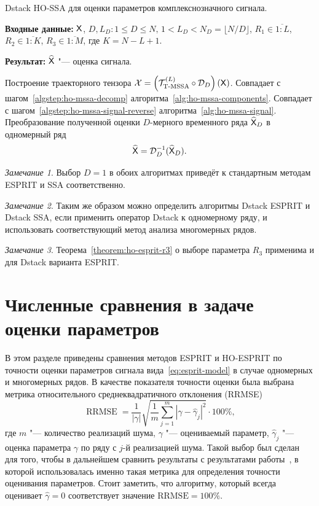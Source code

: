 \documentclass[specialist,
  substylefile=spbu_report.rtx,
subf,href,colorlinks=true, 12pt]{disser}
\theoremstyle{plain}
\theoremstyle{definition}
\theoremstyle{remark}
\newtheorem{remark}{Замечание}[section]
\newcommand{\Input}{\textbf{Входные данные: }}
\newcommand{\Output}{\textbf{Результат: }}
\begin{document}
\begin{algorithm}[!ht]
  \caption{Dstack HO-SSA для оценки параметров комплекснозначного сигнала.}
  \label{alg:dstack-ho-ssa}
  \Input $\mathsf{X}$, $D, L_D: 1 \leqslant D \leqslant N,\, 1 < L_D < N_D =
  \lfloor N /
  D \rfloor$,
  $R_1 \in \overline{1:L}$, $R_2 \in \overline{1:K}$, $R_3 \in
  \overline{1:M}$, где $K = N-L+1$.

  \Output $\widehat{\mathsf{X}}$ "--- оценка сигнала.
  \begin{algorithmic}[1]
    \State Построение траекторного тензора $\mathcal{X} =
    \left(\mathcal{T}_{\textrm{T-MSSA}}^{(L)} \circ \mathcal{D}_D\right) (\mathsf{X})$.
    \State Совпадает с шагом~\ref{algstep:ho-mssa-decomp}
    алгоритма~\ref{alg:ho-mssa-components}.
    \State Совпадает с шагом~\ref{algstep:ho-mssa-signal-reverse}
    алгоритма~\ref{alg:ho-mssa-signal}.
    \State Преобразование полученной оценки $D$-мерного временного ряда
    $\widehat{\mathsf{X}}_D$ в одномерный ряд
    \[
      \widehat{\mathsf{X}} = \mathcal{D}_D^{-1}(\widehat{\mathsf{X}}_D).
    \]
  \end{algorithmic}
\end{algorithm}
\begin{remark}
  Выбор $D=1$ в обоих алгоритмах приведёт к стандартным методам
  ESPRIT и SSA соответственно.
\end{remark}
\begin{remark}
  Таким же образом можно определить алгоритмы Dstack ESPRIT и Dstack SSA, если
  применить оператор Dstack к одномерному ряду, и использовать
  соответствующий метод
  анализа многомерных рядов.
\end{remark}
\begin{remark}
  Теорема~\ref{theorem:ho-esprit-r3} о выборе параметра $R_3$
  применима и для Dstack варианта ESPRIT.
\end{remark}

\section{Численные сравнения в задаче оценки
параметров}\label{sec:esprit-comparison}
В этом разделе приведены сравнения методов ESPRIT и HO-ESPRIT по
точности оценки параметров сигнала
вида~\eqref{eq:esprit-model} в случае одномерных и многомерных рядов.
В качестве показателя точности оценки была выбрана метрика
относительного среднеквадратичного
отклонения (RRMSE)
\begin{equation}
  \label{eq:rrmse}
  \operatorname{RRMSE} = \frac{1}{|\gamma|}\sqrt{\frac{1}{m}
  \sum_{j=1}^{m} \left|\gamma-\widehat{\gamma}_j\right|^2} \cdot 100\%,
\end{equation}
где $m$ "--- количество реализаций шума, $\gamma$ "--- оцениваемый
параметр, $\widehat{\gamma}_j$ "---
оценка параметра $\gamma$ по ряду с $j$-й реализацией шума.
Такой выбор был сделан для того, чтобы в дальнейшем сравнить
результаты с результатами
работы~\cite{hosvd-hooi-separation}, в которой использовалась именно
такая метрика для определения
точности оценивания параметров.
Стоит заметить, что алгоритму, который всегда оценивает
$\widehat{\gamma}=0$ соответствует значение $\text{RRMSE}=100\%$.
\end{document}
